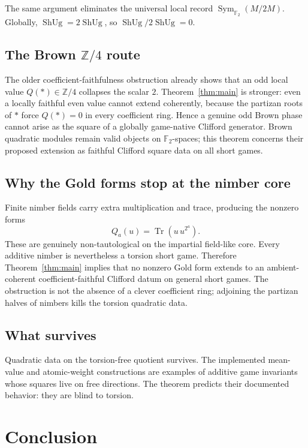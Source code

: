\documentclass[11pt]{article}
\theoremstyle{definition}
\theoremstyle{remark}
\newcommand{\Z}{\mathbb Z}
\newcommand{\F}{\mathbb F}
\newcommand{\ShUg}{\operatorname{ShUg}}
\begin{document}
The same argument eliminates the universal local record
$\operatorname{Sym}_{\F_2}(M/2M)$.  Globally,
$\ShUg=2\ShUg$, so $\ShUg/2\ShUg=0$.

\subsection{The Brown \texorpdfstring{$\Z/4$}{Z/4} route}

The older coefficient-faithfulness obstruction already shows that an odd
local value $Q(*)\in\Z/4$ collapses the scalar $2$.  Theorem~\ref{thm:main}
is stronger: even a locally faithful even value cannot extend coherently,
because the partizan roots of $*$ force $Q(*)=0$ in every coefficient ring.
Hence a genuine odd Brown phase cannot arise as the square of a globally
game-native Clifford generator.  Brown quadratic modules remain valid objects
on $\F_2$-spaces; this theorem concerns their proposed extension as faithful
Clifford square data on all short games.

\subsection{Why the Gold forms stop at the nimber core}

Finite nimber fields carry extra multiplication and trace, producing the
nonzero forms
\[
 Q_a(u)=\operatorname{Tr}(u\,u^{2^a}).
\]
These are genuinely non-tautological on the impartial field-like core.  Every
additive nimber is nevertheless a torsion short game.  Therefore
Theorem~\ref{thm:main} implies that no nonzero Gold form extends to an
ambient-coherent coefficient-faithful Clifford datum on general short games.
The obstruction is not the absence of a clever coefficient ring; adjoining
the partizan halves of nimbers kills the torsion quadratic data.

\subsection{What survives}

Quadratic data on the torsion-free quotient survives.  The implemented
mean-value and atomic-weight constructions are examples of additive game
invariants whose squares live on free directions.  The theorem predicts their
documented behavior: they are blind to torsion.

\section{Conclusion}
\end{document}
